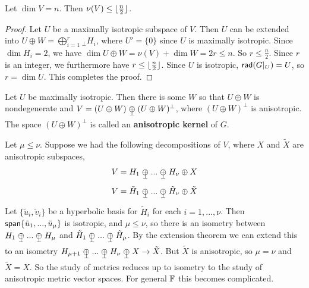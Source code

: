 \begin{lemma}
    Let $\dim V = n$. Then $\nu(V) \leq \lfloor\frac{n}{2}\rfloor$.\label{lemma83}
\end{lemma}
\begin{proof}
    Let $U$ be a maximally isotropic subspace of $V$. Then $U$ can be extended into $U\oplus W = \bigoplus_{i=1}^r{}_\perp H_i$, where $U' = \{0\}$ since $U$ is maximally isotropic. Since $\dim H_i = 2$, we have $\dim U\oplus W = \nu(V) + \dim W = 2r\leq  n$. So $r \leq \frac{n}{2}$. Since $r$ is an integer, we furthermore have $r\leq \lfloor\frac{n}{2}\rfloor$. Since $U$ is isotropic, $\operatorname{\textsf{rad}} (G|_{U}) = U$, so $r=\dim U$. This completes the proof.
\end{proof}
\begin{defn}
    Let $U$ be maximally isotropic. Then there is some $W$ so that $U\oplus W$ is nondegenerate and $V = (U\oplus W)\orthoplus(U\oplus W)^\perp$, where $(U\oplus W)^\perp$ is anisotropic. The space $(U\oplus W)^\perp$ is called an \textbf{anisotropic kernel} of $G$.
\end{defn}
\begin{remark*}
    Let $\mu \leq \nu$. Suppose we had the following decompositions of $V$, where $X$ and $\tilde{X}$ are anisotropic subspaces,
    \[V = H_1\orthoplus...\orthoplus H_\nu \oplus X\]
    \[V = \tilde{H}_1\orthoplus...\orthoplus \tilde{H}_\nu \oplus \tilde{X}\]
    Let $\{\tilde{u}_i,\tilde{v}_i\}$ be a hyperbolic basis for $\tilde{H}_i$ for each $i=1,...,\nu$. Then $\operatorname{\textsf{span}}\{\tilde{u}_1,...,\tilde{u}_\mu\}$ is isotropic, and $\mu \leq \nu$, so there is an isometry between $H_1\orthoplus...\orthoplus H_\mu$ and $\tilde{H}_1\orthoplus...\orthoplus \tilde{H}_\mu$. By the extension theorem we can extend this to an isometry $H_{\mu+1}\orthoplus...\orthoplus H_\nu \orthoplus X \to\tilde{X}$. But $\tilde{X}$ is anisotropic, so $\mu=\nu$ and $\tilde{X}=X$. So the study of metrics reduces up to isometry to the study of anisotropic metric vector spaces. For general $\operatorname{\mathbb{F}}$ this becomes complicated.
\end{remark*}
